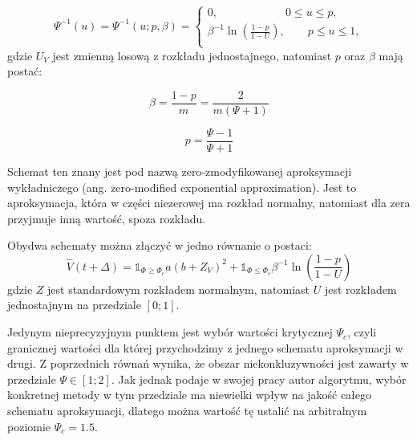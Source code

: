 \documentclass{pracamgr}
\begin{document}
{\begin{equation}
\label{eq:psi}
\Psi^{-1}(u) = \Psi^{-1}(u;p,\beta) = \begin{cases}
               0, \qquad \qquad \qquad  0 \le u \leq p,\\
               \beta^{-1} \ln (\frac{1-p}{1-U}), \qquad  p \le u \leq 1, \\
            \end{cases} 
\end{equation} 
gdzie $U_V$ jest zmienną losową z rozkładu jednostajnego, natomiast $p$ oraz $\beta$ mają postać:




\begin{equation}
\label{eq:beta}
\beta = \frac{1-p}{m} = \frac{2}{m(\Psi + 1)}
\end{equation}

\begin{equation}
\label{eq:p}
p = \frac{\Psi - 1}{\Psi + 1}
\end{equation}

Schemat ten znany jest pod nazwą zero-zmodyfikowanej aproksymacji wykładniczego (ang. zero-modified exponential approximation). Jest to aproksymacja, która w części niezerowej ma rozkład normalny, natomiast dla zera przyjmuje inną wartość, spoza rozkładu. 


Obydwa schematy można złączyć w jedno równanie o postaci:
\begin{equation}
\label{eq:andersen}
\hat{V}(t + \Delta)  = \mathbb{1}_{\Phi \geq \Phi_c} a (b + Z_V)^2
 + \mathbb{1}_{\Phi \le \Phi_c} \beta^{-1} \ln (\frac{1-p}{1-U})
\end{equation}
gdzie $Z$ jest standardowym rozkładem normalnym, natomiast $U$ jest rozkładem jednostajnym na przedziale $[0;1]$.


Jedynym nieprecyzyjnym punktem jest wybór wartości krytycznej $\Psi_c$, czyli granicznej wartości dla której przychodzimy z jednego schematu aproksymacji w drugi. 
Z poprzednich równań wynika, że obszar niekonkluzywności jest zawarty w przedziale $\Psi \in [1;2]$.
Jak jednak podaje w swojej pracy autor algorytmu, wybór konkretnej metody w tym przedziale ma niewielki wpływ na jakość całego schematu aproksymacji, dlatego można wartość tę ustalić na arbitralnym poziomie $\Psi_c = 1.5$. 
 


}
\end{document}
